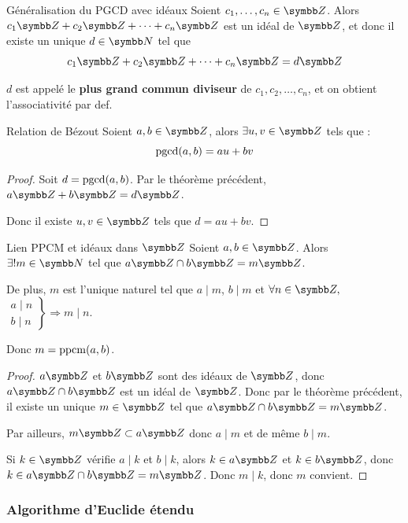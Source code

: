 \begin{proposition}{Généralisation du PGCD avec idéaux}{}
    Soient $c_1, \ldots, c_n \in \Z$. Alors $c_1 \Z + c_2 \Z + \cdots + c_n \Z$ est un 
    idéal de $\Z$, et donc il existe un unique $d \in \N$ tel que 
    \[c_1 \Z + c_2 \Z + \cdots + c_n \Z = d \Z\]

    $d$ est appelé le \textbf{plus grand commun diviseur} de $c_1, c_2, \ldots, c_n$, et 
    on obtient l'associativité par def. 
\end{proposition}

\begin{proposition}{Relation de Bézout}{}
    Soient $a, b \in \Z$, alors $\exists u, v \in \Z$ tels que : 
    \[\operatorname{pgcd}(a, b) = au + bv\]
\end{proposition}

\begin{proof}
    Soit $d = \operatorname{pgcd}(a, b)$. Par le théorème précédent, $a \Z + b \Z = d \Z$.

    Donc il existe $u, v \in \Z$ tels que $d = au + bv$.
\end{proof}

\begin{theoreme}{Lien PPCM et idéaux dans $\Z$}{}
    Soient $a, b \in \Z$. Alors $\exists ! m \in \N$ tel que $a \Z \cap b \Z = m \Z$.

    De plus, $m$ est l'unique naturel tel que $a \mid m$, $b \mid m$ et 
    $\forall n \in \Z,$
    $\left. \begin{aligned}
        a \mid n \\
        b \mid n    
    \end{aligned} \right\} \Rightarrow m \mid n$.

    Donc $m = \operatorname{ppcm}(a, b)$.
\end{theoreme}

\begin{proof}
    $a \Z$ et $b \Z$ sont des idéaux de $\Z$, donc $a \Z \cap b \Z$ est un idéal de $\Z$. 
    Donc par le théorème précédent, il existe un unique $m \in \Z$ tel que $a \Z \cap b \Z = m \Z$.

    Par ailleurs, $m \Z \subset a \Z$ donc $a \mid m$ et de même $b \mid m$.

    Si $k \in \Z$ vérifie $a \mid k$ et $b \mid k$, alors $k \in a \Z$ et $k \in b \Z$, donc
    $k \in a \Z \cap b \Z = m \Z$. Donc $m \mid k$, donc $m$ convient.
\end{proof}

\subsubsection{Algorithme d'Euclide étendu}

